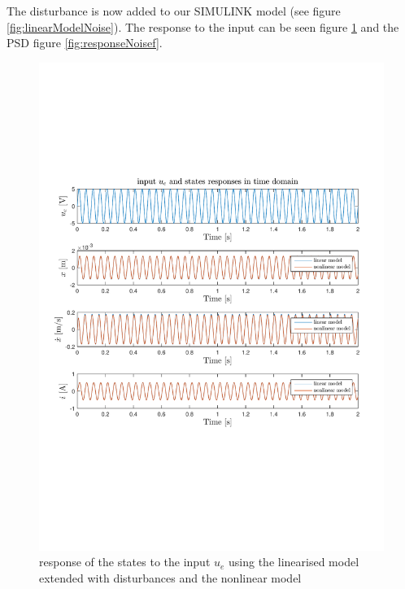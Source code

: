 The disturbance is now added to our SIMULINK model (see figure \ref{fig:linearModelNoise}). The response to the input can be seen figure \ref{fig:responseNoiset} and the PSD figure \ref{fig:responseNoisef}.

\begin{figure}[H]
 \centering 
 \includegraphics[trim=2cm 7cm 2cm 7cm, clip=true, totalheight=0.35\textheight, angle=0]{figures/p11time.pdf}
 \caption{response of the states to the input $u_e$ using the linearised model extended with disturbances and the nonlinear model}
 \label{fig:responseNoiset}
\end{figure}

